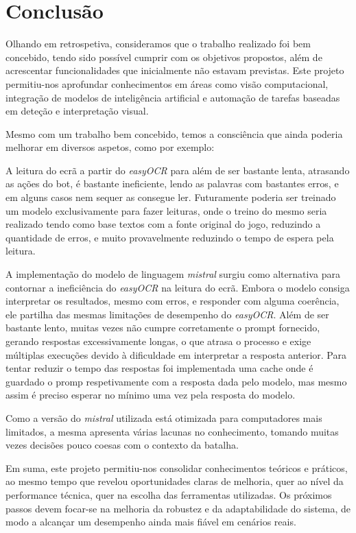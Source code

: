 \documentclass[12pt,a4paper,titlepage]{article}
\begin{document}











\section{Conclusão} \label{conclusao}
Olhando em retrospetiva, consideramos que o trabalho realizado foi bem concebido, tendo sido possível cumprir com os objetivos propostos, além de acrescentar funcionalidades que inicialmente não estavam previstas. Este projeto permitiu-nos aprofundar conhecimentos em áreas como visão computacional, integração de modelos de inteligência artificial e automação de tarefas baseadas em deteção e interpretação visual.


Mesmo com um trabalho bem concebido, temos a consciência que ainda poderia melhorar em diversos aspetos, como por exemplo: 

A leitura do ecrã a partir do \textit{easyOCR} para além de ser bastante lenta, atrasando as ações do bot, é bastante ineficiente, lendo as palavras com bastantes erros, e em alguns casos nem sequer as consegue ler. Futuramente poderia ser treinado um modelo exclusivamente para fazer leituras, onde o treino do mesmo seria realizado tendo como base textos com a fonte original do jogo, reduzindo a quantidade de erros, e muito provavelmente reduzindo o tempo de espera pela leitura.

A implementação do modelo de linguagem \textit{mistral} surgiu como alternativa para contornar a ineficiência do \textit{easyOCR} na leitura do ecrã. Embora o modelo consiga interpretar os resultados, mesmo com erros, e responder com alguma coerência, ele partilha das mesmas limitações de desempenho do \textit{easyOCR}. Além de ser bastante lento, muitas vezes não cumpre corretamente o prompt fornecido, gerando respostas excessivamente longas, o que atrasa o processo e exige múltiplas execuções devido à dificuldade em interpretar a resposta anterior. Para tentar reduzir o tempo das respostas foi implementada uma cache onde é guardado o promp respetivamente com a resposta dada pelo modelo, mas mesmo assim é preciso esperar no mínimo uma vez pela resposta do modelo. 

Como a versão do \textit{mistral} utilizada está otimizada para computadores mais limitados, a mesma apresenta várias lacunas no conhecimento, tomando muitas vezes decisões pouco coesas com o contexto da batalha.

Em suma, este projeto permitiu-nos consolidar conhecimentos teóricos e práticos, ao mesmo tempo que revelou oportunidades claras de melhoria, quer ao nível da performance técnica, quer na escolha das ferramentas utilizadas. Os próximos passos devem focar-se na melhoria da robustez e da adaptabilidade do sistema, de modo a alcançar um desempenho ainda mais fiável em cenários reais.
\end{document}

